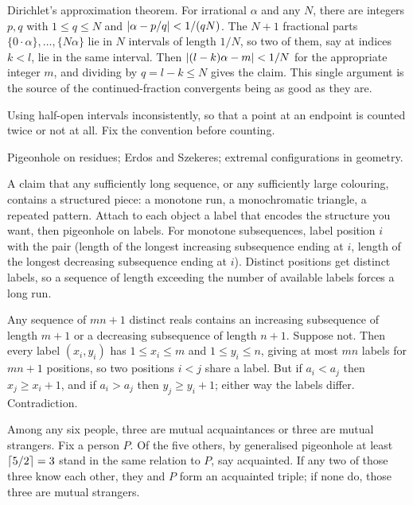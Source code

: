 \begin{worked}
Dirichlet's approximation theorem. For irrational $\alpha$ and any $N$, there are integers $p,q$ with $1\leq q\leq N$ and $\left\lvert \alpha-p/q\right\rvert<1/(qN)$. The $N+1$ fractional parts $\{0\cdot\alpha\},\ldots,\{N\alpha\}$ lie in $N$ intervals of length $1/N$, so two of them, say at indices $k<l$, lie in the same interval. Then $\left\lvert (l-k)\alpha-m\right\rvert<1/N$ for the appropriate integer $m$, and dividing by $q=l-k\leq N$ gives the claim. This single argument is the source of the continued-fraction convergents being as good as they are.
\end{worked}

\begin{trap}
Using half-open intervals inconsistently, so that a point at an endpoint is counted twice or not at all. Fix the convention before counting.
\end{trap}

\begin{seealsob}Pigeonhole on residues; Erdos and Szekeres; extremal configurations in geometry.\end{seealsob}

\cue A claim that any sufficiently long sequence, or any sufficiently large colouring, contains a structured piece: a monotone run, a monochromatic triangle, a repeated pattern.
\method Attach to each object a label that encodes the structure you want, then pigeonhole on labels. For monotone subsequences, label position $i$ with the pair (length of the longest increasing subsequence ending at $i$, length of the longest decreasing subsequence ending at $i$). Distinct positions get distinct labels, so a sequence of length exceeding the number of available labels forces a long run.

\begin{worked}
Any sequence of $mn+1$ distinct reals contains an increasing subsequence of length $m+1$ or a decreasing subsequence of length $n+1$. Suppose not. Then every label $(x_{i},y_{i})$ has $1\leq x_{i}\leq m$ and $1\leq y_{i}\leq n$, giving at most $mn$ labels for $mn+1$ positions, so two positions $i<j$ share a label. But if $a_{i}<a_{j}$ then $x_{j}\geq x_{i}+1$, and if $a_{i}>a_{j}$ then $y_{j}\geq y_{i}+1$; either way the labels differ. Contradiction.
\end{worked}

\begin{worked}
Among any six people, three are mutual acquaintances or three are mutual strangers. Fix a person $P$. Of the five others, by generalised pigeonhole at least $\left\lceil 5/2\right\rceil=3$ stand in the same relation to $P$, say acquainted. If any two of those three know each other, they and $P$ form an acquainted triple; if none do, those three are mutual strangers.
\end{worked}

